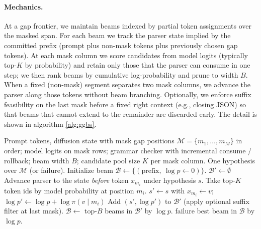 \paragraph{Mechanics.}
At a gap frontier, we maintain beams indexed by partial token assignments over the masked span. For each beam we track the parser state implied by the committed prefix (prompt plus non-mask tokens plus previously chosen gap tokens). At each mask column we score candidates from model logits (typically top-$K$ by probability) and retain only those that the parser can consume in one step; we then rank beams by cumulative log-probability and prune to width $B$. When a fixed (non-mask) segment separates two mask columns, we advance the parser along those tokens without beam branching. Optionally, we enforce suffix feasibility on the last mask before a fixed right context (e.g., closing JSON) so that beams that cannot extend to the remainder are discarded early. The detail is shown in algorithm \ref{alg:ggbs}.


\begin{algorithm*}[t]
\caption{Grammar-Guided Beam Search (GGBS) over a bidirectional mask gap}
\label{alg:ggbs}
\begin{algorithmic}[1]
\Require Prompt tokens, diffusion state with mask gap positions
  $\mathcal{M}=\{m_1,\ldots,m_M\}$ in order; model logits on mask rows;
  grammar checker with incremental consume / rollback; beam width $B$;
  candidate pool size $K$ per mask column.
\Ensure One hypothesis over $\mathcal{M}$ (or failure).
\State Initialize beam $\mathcal{B} \gets \{(\text{prefix},\ \log p \gets 0)\}$.
  \State $\mathcal{B}' \gets \emptyset$
    \State Advance parser to the state \emph{before} token $x_{m_i}$ under hypothesis $s$.
    \State Take top-$K$ token ids by model probability at position $m_i$.
        \State $s' \gets s$ with $x_{m_i}\gets v$; $\log p' \gets \log p + \log \pi(v\mid m_i)$
        \State Add $(s',\log p')$ to $\mathcal{B}'$ (apply optional suffix filter at last mask).
      \EndIf
    \EndFor
  \EndFor
  \State $\mathcal{B} \gets$ top-$B$ beams in $\mathcal{B}'$ by $\log p$.
   \Return failure \EndIf
\EndFor
\State \Return best beam in $\mathcal{B}$ by $\log p$.
\end{algorithmic}
\end{algorithm*}

